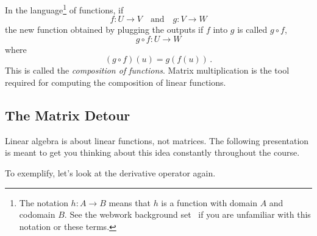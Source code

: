 In the language\footnote{The notation $h:A\to B$ means that $h$ is a function with domain $A$ and codomain $B$. See the webwork  background  set~ if you are unfamiliar with this notation or these terms.} 
of functions, if \[f:U\longrightarrow V\quad \mbox{and}\quad g:V\longrightarrow W\]
the new function obtained by plugging the outputs if $f$ into $g$ is called $g\circ f$,
\[
g\circ f:
U\longrightarrow  W\]
where
\[
(g\circ f)(u)=g(f(u))\, .
\]
This is called the {\itshape composition of functions}.
Matrix multiplication is the tool required for computing the composition of linear functions.


\subsection{The Matrix Detour}
Linear algebra is about linear functions, not matrices. 
The following presentation is meant to get you thinking about this idea constantly throughout the course.
\begin{center}
\end{center}
To exemplify, let's look at the derivative operator again.

